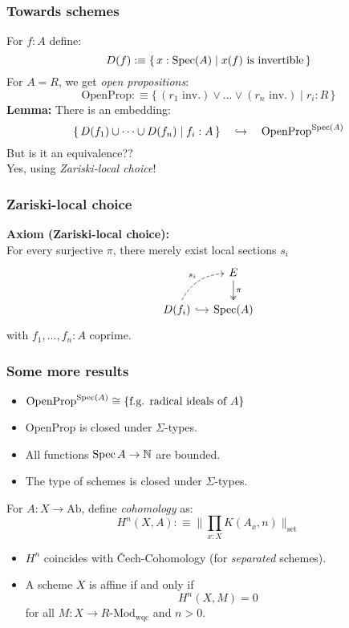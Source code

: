 \documentclass{beamer}
\begin{document}
\begin{frame}
  \frametitle{Towards schemes}
  For $f:A$ define:
  \[ D(f):\equiv \{\, x:\operatorname{Spec}(A) \mid x(f)\text{ is invertible} \,\}\]
  \pause
  For $A = R$, we get \emph{open propositions}:
  \[ \mathrm{OpenProp} :\equiv
    \{\,(r_1 \text{ inv.}) \lor \dots \lor (r_n \text{ inv.}) \mid r_i : R \,\}
  \]
  \pause
  \textbf{Lemma:}
  There is an embedding:
  \[ \{\,D(f_1) \cup \dots \cup D(f_n) \mid f_i : A \,\}
     \quad\hookrightarrow\quad
     \mathrm{OpenProp}^{\operatorname{Spec}(A)}
  \]
  But is it an equivalence??\\
  \pause
  Yes, using \emph{Zariski-local choice}!
\end{frame}

\begin{frame}
  \frametitle{Zariski-local choice}
  \textbf{Axiom (Zariski-local choice):}\\
  For every surjective $\pi$, there merely exist local sections $s_i$
  \[ \begin{tikzcd}[ampersand replacement=\&, column sep=small]
    \& E \ar[d, two heads, "\pi"] \\
    D(f_i) \ar[r, hook] \ar[ur, bend left, dashed, "s_i"] \& \Spec(A)
  \end{tikzcd} \]
  with $f_1, \dots, f_n : A$ coprime.
\end{frame}

\begin{frame}
  \frametitle{Some more results}
  \begin{itemize}
    \item
      $\mathrm{OpenProp}^{\operatorname{Spec}(A)} \cong \{\text{f.g. radical ideals of $A$}\}$
    \item
      $\mathrm{OpenProp}$ is closed under $\Sigma$-types.
    \item
      All functions $\operatorname{Spec} A \to \mathbb{N}$ are bounded.
    \item
      The type of schemes is closed under $\Sigma$-types.
  \end{itemize}

  \pause
  \vspace{0.25cm}
  For $A : X \to \mathrm{Ab}$, define \emph{cohomology} as:
  \[ H^n(X, A) :\equiv \Big\| \prod_{x:X}K(A_x,n) \Big\|_{\mathrm{set}} \]
  \begin{itemize}
    \item
      $H^n$ coincides with \v{C}ech-Cohomology (for \emph{separated} schemes).
    \item
      A scheme $X$ is affine if and only if
      \[ H^n(X, M) = 0 \]
      for all $M : X \to R\text{-}\mathrm{Mod}_{\mathrm{wqc}}$ and $n > 0$.
  \end{itemize}
\end{frame}
\end{document}
